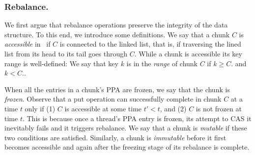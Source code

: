 \subsubsection{Rebalance.}
\label{ssec:rebalance-proof}

We first argue that rebalance operations preserve the integrity of the data structure.  
To this end, we introduce some definitions. 
We say that a chunk $C$ is \emph{accessible} in \kiwi\ if $C$ is connected to the linked list, 
that is, if traversing the lined list from its head to its tail goes through $C$. 
While a chunk is accessible its key range is well-defined: 
We say that key $k$ is in the \emph{range} of chunk $C$ if $k \geq C$. and $k < C.$.

When all the entries in a chunk's PPA are frozen, we say that the chunk is \emph{frozen}. 
Observe that a put operation can successfully complete in chunk $C$ at a time $t$ only if  (1) $C$ is accessible  at some time $t'<t$, 
and (2) $C$ is not frozen at time $t$. This is because once a thread's PPA entry is frozen, its attempt to CAS it inevitably fails and it triggers rebalance.
We say that a chunk is \emph{mutable} if these two conditions are satisfied. Similarly, a chunk is \emph{immutable} before it first becomes accessible 
and again after the freezing stage of its rebalance is complete. 

